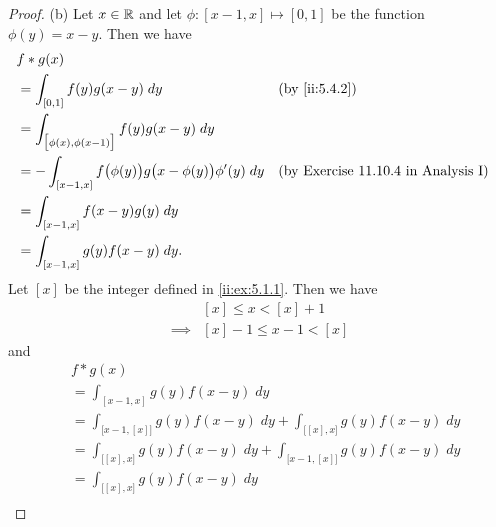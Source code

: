 \begin{proof}{(b)}
  Let \(x \in \mathbb{R}\) and let \(\phi : [x - 1, x] \mapsto [0, 1]\) be the function \(\phi(y) = x - y\).
  Then we have
  \begin{align*}
     & f * g(x)                                                                                                                      \\
     & = \int_{[0, 1]} f(y) g(x - y) \; dy                                           &  & \by{ii:5.4.2}                              \\
     & = \int_{\big[\phi(x), \phi(x - 1)\big]} f(y) g(x - y) \; dy                                                                   \\
     & = -\int_{[x - 1, x]} f\big(\phi(y)\big) g\big(x - \phi(y)\big) \phi'(y) \; dy &  & \text{(by Exercise 11.10.4 in Analysis I)} \\
     & = \int_{[x - 1, x]} f(x - y) g(y) \; dy                                                                                       \\
     & = \int_{[x - 1, x]} g(y) f(x - y) \; dy.                                                                                      \\
  \end{align*}
  Let \([x]\) be the integer defined in \cref{ii:ex:5.1.1}.
  Then we have
  \begin{align*}
             & [x] \leq x < [x] + 1     \\
    \implies & [x] - 1 \leq x - 1 < [x]
  \end{align*}
  and
  \begin{align*}
     & f * g(x)                                                                                                                                     \\
     & = \int_{[x - 1, x]} g(y) f(x - y) \; dy                                                                                                      \\
     & = \int_{\big[x - 1, [x]\big]} g(y) f(x - y) \; dy + \int_{\big[[x], x\big]} g(y) f(x - y) \; dy                                              \\
     & = \int_{\big[[x], x\big]} g(y) f(x - y) \; dy + \int_{\big[x - 1, [x]\big]} g(y) f(x - y) \; dy                                              \\
     & = \int_{\big[[x], x\big]} g(y) f(x - y) \; dy                                                                                                \\

\end{align*}
\end{proof}
